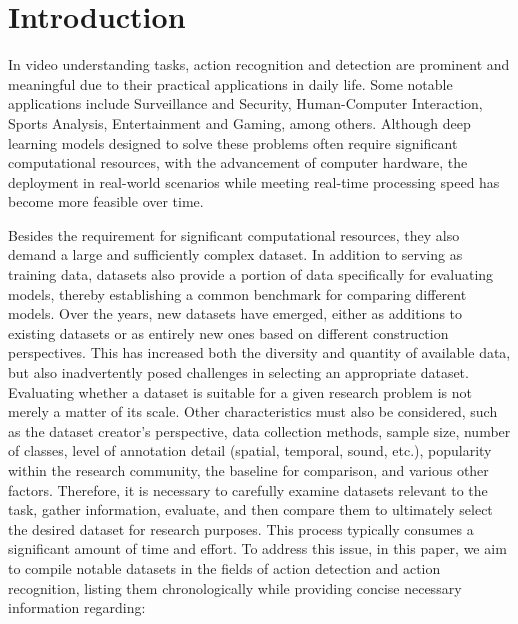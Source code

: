 \documentclass[a4paper]{article}
\begin{document}
	
\section{Introduction}
In video understanding tasks, action recognition and detection are prominent and
meaningful due to their practical applications in daily life. Some notable
applications include Surveillance and Security, Human-Computer Interaction,
Sports Analysis, Entertainment and Gaming, among others. Although deep learning
models designed to solve these problems often require significant computational
resources, with the advancement of computer hardware, the deployment in
real-world scenarios while meeting real-time processing speed has become more
feasible over time.

Besides the requirement for significant computational resources, they also
demand a large and sufficiently complex dataset. In addition to serving as
training data, datasets also provide a portion of data specifically for
evaluating models, thereby establishing a common benchmark for comparing
different models. Over the years, new datasets have emerged, either as additions
to existing datasets or as entirely new ones based on different construction
perspectives. This has increased both the diversity and quantity of available
data, but also inadvertently posed challenges in selecting an appropriate
dataset. Evaluating whether a dataset is suitable for a given research problem
is not merely a matter of its scale. Other characteristics must also be
considered, such as the dataset creator's perspective, data collection methods,
sample size, number of classes, level of annotation detail (spatial, temporal,
sound, etc.), popularity within the research community, the baseline for
comparison, and various other factors. Therefore, it is necessary to carefully
examine datasets relevant to the task, gather information, evaluate, and then
compare them to ultimately select the desired dataset for research purposes.
This process typically consumes a significant amount of time and effort. To
address this issue, in this paper, we aim to compile notable datasets in the
fields of action detection and action recognition, listing them chronologically
while providing concise necessary information regarding:
\end{document}
